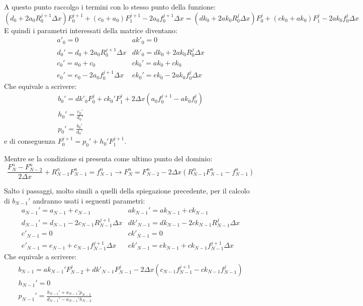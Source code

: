 \documentclass[]{article}
\newcommand{\lr}[3]{\ensuremath{\left#1 #3 \right#2}}
\newcommand{\lrt}[1]{\lr{(}{)}{#1}}
\numberwithin{equation}{subsection}
\begin{document}
A questo punto raccolgo i termini con lo stesso punto della funzione:
\begin{equation}
\lrt{d_0 + 2 a_0 R_0^{j+1}\Delta x} F_0^{j+1} + \lrt{c_0+a_0}F^{j+1}_1 
- 2 a_0 f^{j+1}_0 \Delta x = 
\lrt{dk_0 + 2 ak_0 R_0^{j}\Delta x} F_0^{j} + \lrt{ck_0+ak_0}F^{j}_1 
- 2 ak_0 f^j_0 \Delta x
\end{equation}
E quindi i parametri interessati della matrice diventano:
\begin{equation}
\begin{array}{ll}
a'_0 = 0 & ak'_0= 0\\
d_0' = d_0 + 2 a_0 R_0^{j+1}\Delta x& dk'_0 = dk_0 + 2 ak_0 R_0^{j}\Delta x\\
c_0' = a_0+c_0 & ck_0' = ak_0+ck_0\\
e_0' = e_0 - 2 a_0  f^{j+1}_0 \Delta x & ek_0' = ek_0 - 2 ak_0  f^{j}_0 \Delta x
\end{array}
\end{equation}
Che equivale a scrivere:
\begin{equation}
\begin{array}{l}
b_0' = dk'_0 F_0^j  + ck_0' F_1^j + 2 \Delta x \lrt{a_0 f^{j+1}_0-ak_0 f^j_0}\\
h_0' = \frac{c_0'}{d_0'}\\
p_0' = \frac{b_0'}{d_0'}
\end{array}
\end{equation}
e di conseguenza $F_0^{j+1} = p_{0}' + h_0' F_1^{j+1}$.

Mentre se la condizione si presenta come ultimo punto del dominio:
\begin{equation}
\frac{F_{N}^{n}-F_{N-2}^{n}}{2\Delta x} + R_{N-1}^nF_{N-1}^{n} = f_{N-1}^n  \to 
F_{N}^{n} = F_{N-2}^{n} - 2\Delta x \lrt{R_{N-1}^nF_{N-1}^{n}-f^n_{N-1}}
\end{equation}

Salto i passaggi, molto simili a quelli della spiegazione precedente,
per il calcolo di $b_{N-1}'$ andranno usati i seguenti parametri:
\begin{equation}
\begin{array}{ll}
a_{N-1}' = a_{N-1}+c_{N-1} & ak_{N-1}' = ak_{N-1}+ck_{N-1}\\
d_{N-1}' = d_{N-1} - 2 c_{N-1} R_{N-1}^{j+1}\Delta x& dk'_{N-1} = dk_{N-1} - 2 ck_{N-1} R_{N-1}^{j}\Delta x\\
c'_{N-1} = 0 & ck'_{N-1}= 0\\
e'_{N-1} = e_{N-1} + c_{N-1} f^{j+1}_{N-1}\Delta x & ek'_{N-1} = ek_{N-1} + ck_{N-1} f^{j+1}_{N-1}\Delta x
\end{array}
\end{equation}
Che equivale a scrivere:
\begin{equation}
\begin{array}{l}
b_{N-1} = ak_{N-1}' F_{N-2}^j + dk'_{N-1} F_{N-1}^j - 2 \Delta x \lrt{c_{N-1} f^{j+1}_{N-1}-ck_{N-1} f^j_{N-1}}\\
h_{N-1}' = 0\\
p_{N-1}' = \frac{b_{N-1}' + a_{N-1}'p_{N-2}}{d_{N-1}' - a_{N-1}'h_{N-2}}
\end{array}
\end{equation}
\end{document}
